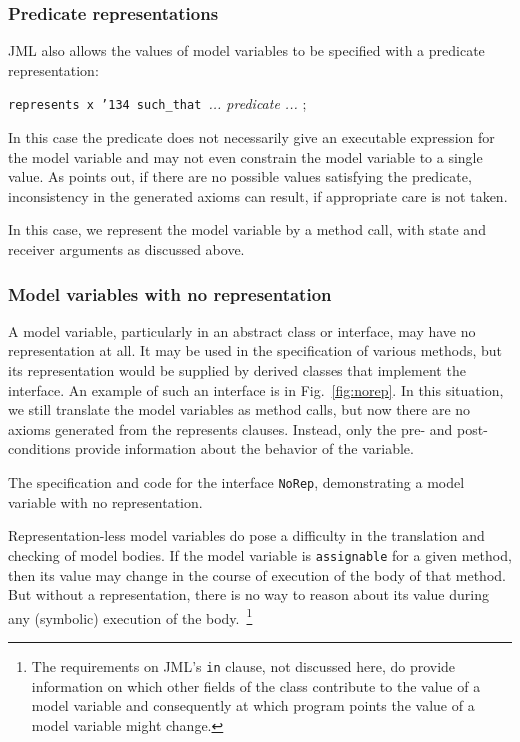 \documentclass{sig-alternate}
\begin{document}
\subsubsection{Predicate representations}

JML also allows the values of model variables to be specified with a predicate representation:
\begin{center} \texttt{represents x \char'134 such\_that }{\em ... predicate ... } ; \end{center}
In this case the predicate does not necessarily give an executable expression for the
model variable and may not even constrain the model variable to a single value.  As
\cite{BreunessePoll03} points out, if there are no possible values satisfying the predicate, 
inconsistency in the generated axioms can result, if appropriate care is not taken.

In this case, we represent the model variable by a method call, with state and receiver arguments
as discussed above.

\subsubsection{Model variables with no representation}

A model variable, particularly in an abstract class or interface, may have no representation
at all.  It may be used in the specification of various methods, but its representation would be
supplied by derived classes that implement the interface.  An example of such an interface is
in Fig.~\ref{fig:norep}.  In this situation, we still translate the model variables as method calls,
but now there are no axioms generated from the represents clauses.  Instead, only the
pre- and post-conditions provide information about the behavior of the variable.

\begin{BFIGURE}

\caption{The specification and code for the interface \texttt{NoRep},
demonstrating a model variable with no representation.}
\label{fig:norep}
\end{BFIGURE}

Representation-less model variables do pose a difficulty in the translation and checking of model bodies.  If the model variable is \texttt{assignable} for a given method, then its value may 
change in the course of execution of the body of that method.  But without a representation,
there is no way to reason about its value during any (symbolic) execution of the 
body.~\footnote{The requirements on JML's  \texttt{in} clause, not discussed here, do provide information
on which other fields of the class contribute to the value of a model variable and consequently
at which program points the value of a model variable might change.}
\end{document}
